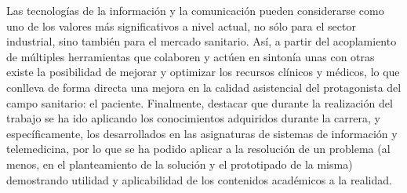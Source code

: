 \documentclass{article}
\begin{document}
Las  tecnologías  de  la  información	y   la	 comunicación	pueden
considerarse como uno  de  los	valores  más  significativos  a  nivel
actual, no sólo para  el  sector  industrial,  sino  también  para  el
mercado sanitario.   Así,  a  partir  del  acoplamiento  de  múltiples
herramientas que colaboren y actúen en sintonía unas con otras	existe
la posibilidad de mejorar y optimizar los recursos clínicos y médicos,
lo que conlleva de forma directa una mejora en la calidad  asistencial
del  protagonista  del	campo  sanitario:  el  paciente.   Finalmente,
destacar que durante la realización del trabajo se  ha	ido  aplicando
los conocimientos adquiridos durante la  carrera,  y  específicamente,
los desarrollados en las asignaturas  de  sistemas  de	información  y
telemedicina, por lo que se ha podido aplicar a la  resolución	de  un
problema  (al  menos,  en  el  planteamiento  de  la  solución	y   el
prototipado de la misma) demostrando utilidad y aplicabilidad  de  los
contenidos académicos a la realidad.


\newpage


\end{document}
